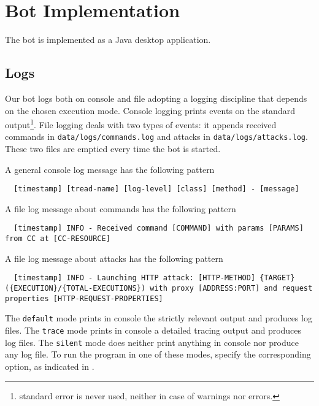 \section{Bot Implementation}
\label{sec:bot-implementation}

The bot is implemented as a Java desktop application.

\textcolor{blue}{\lipsum[1]}

\subsection{Logs}
\label{sec:logs}

Our bot logs both on console and file adopting a logging discipline that depends on the chosen execution mode.
Console logging prints events on the standard output\footnote{standard error is never used, neither in case of warnings nor errors.}.
File logging deals with two types of events: it appends received commands in \texttt{data/logs/commands.log} and attacks in \texttt{data/logs/attacks.log}. These two files are emptied every time the bot is started.

A general console log message has the following pattern

\begin{verbatim}
  [timestamp] [tread-name] [log-level] [class] [method] - [message]
\end{verbatim}

A file log message about commands has the following pattern

\begin{verbatim}
  [timestamp] INFO - Received command [COMMAND] with params [PARAMS] from CC at [CC-RESOURCE]
\end{verbatim}

A file log message about attacks has the following pattern

\begin{verbatim}
  [timestamp] INFO - Launching HTTP attack: [HTTP-METHOD] {TARGET} ({EXECUTION}/{TOTAL-EXECUTIONS}) with proxy [ADDRESS:PORT] and request properties [HTTP-REQUEST-PROPERTIES]
\end{verbatim}


The \texttt{default} mode prints in console the strictly relevant output and produces log files. The \texttt{trace} mode prints in console a detailed tracing output and produces log files. The \texttt{silent} mode does neither print anything in console nor produce any log file.
To run the program in one of these modes, specify the corresponding option, as indicated in .


